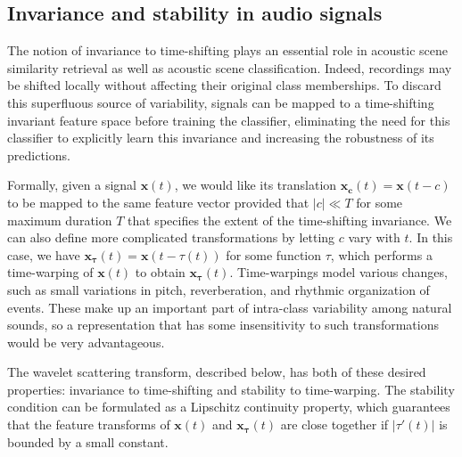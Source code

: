 \documentclass[journal]{IEEEtran}
\begin{document}
\subsection{Invariance and stability in audio signals}
The notion of invariance to time-shifting plays an essential role in acoustic scene similarity retrieval as well as acoustic scene classification.
Indeed, recordings may be shifted locally without affecting their original class memberships.
To discard this superfluous source of variability, signals can be mapped to a time-shifting invariant feature space before training the classifier, eliminating the need for this classifier to explicitly learn this invariance and increasing the robustness of its predictions.

Formally, given a signal $\boldsymbol{x}(t)$, we would like its translation $\boldsymbol{x_c}(t) = \boldsymbol{x}(t-c)$ to be mapped to the same feature vector provided that $|c| \ll T$ for some maximum duration $T$ that specifies the extent of the time-shifting invariance. We can also define more complicated transformations by letting $c$ vary with $t$. In this case, we have $\boldsymbol{x_\tau}(t) = \boldsymbol{x}(t-\tau(t))$ for some function $\tau$, which performs a time-warping of $\boldsymbol{x}(t)$ to obtain $\boldsymbol{x_\tau}(t)$. Time-warpings model various changes, such as small variations in pitch, reverberation, and rhythmic organization of events. These make up an important part of intra-class variability among natural sounds, so a representation that has some insensitivity to such transformations would be very advantageous.

The wavelet scattering transform, described below, has both of these desired properties: invariance to time-shifting and stability to time-warping. The stability condition can be formulated as a Lipschitz continuity property, which guarantees that the feature transforms of $\boldsymbol{x}(t)$ and $\boldsymbol{x_\tau}(t)$ are close together if $|\tau'(t)|$ is bounded by a small constant.
\end{document}
